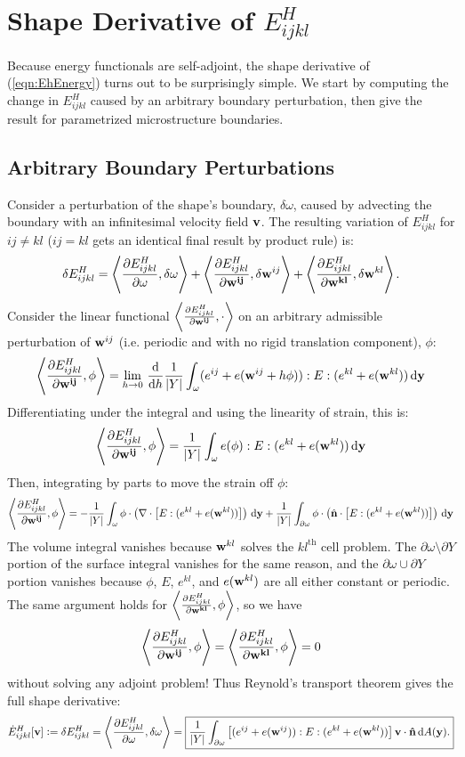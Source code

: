\documentclass[10pt]{article}
\providecommand{\dA}{\, \mathrm{d}A}
\providecommand{\pder}[2]{\frac{\partial #1}{\partial #2}}
\providecommand{\tder}[2]{\frac{\mathrm{d} #1}{\mathrm{d} #2}}
\newcommand{\defeq}{\vcentcolon=}
\begin{document}
\section{Shape Derivative of $E^H_{ijkl}$}
Because energy functionals are self-adjoint, the shape derivative of
(\ref{eqn:EhEnergy}) turns out to be surprisingly simple. We start by computing
the change in $E^H_{ijkl}$ caused by an arbitrary boundary perturbation, then
give the result for parametrized microstructure boundaries.

\subsection{Arbitrary Boundary Perturbations}
Consider a perturbation of the shape's boundary, $\delta\omega$, caused by
advecting the boundary with an infinitesimal velocity field ${\bf v}$. The
resulting variation of $E^H_{ijkl}$ for $ij \ne kl$ ($ij = kl$ gets an
identical final result by product rule) is:
$$
\delta E^H_{ijkl} = \left<\pder{E^H_{ijkl}}{\omega}, \delta \omega\right>
    + \left<\pder{E^H_{ijkl}}{{\bf w^{ij}}}, \delta {\bf w}^{ij}\right>
    + \left<\pder{E^H_{ijkl}}{{\bf w^{kl}}}, \delta {\bf w}^{kl}\right>.
$$
Consider the linear functional
$\left<\pder{E^H_{ijkl}}{{\bf w^{ij}}}, \cdot \right>$  on an arbitrary
admissible perturbation of ${\bf w}^{ij}$ (i.e. periodic and with no rigid
translation component), $\phi$:
$$
\left<\pder{E^H_{ijkl}}{{\bf w^{ij}}}, \phi\right> =
\lim_{h \to 0} \, \tder{}{h} \frac{1}{|Y|} \int_\omega (e^{ij} + e({\bf w}^{ij} + h \phi)) : E : (e^{kl} + e({\bf w}^{kl})) \, \mathrm{d} {\bf y}
$$
Differentiating under the integral and using the linearity of strain, this is:
$$
\left<\pder{E^H_{ijkl}}{{\bf w^{ij}}}, \phi\right> =
\frac{1}{|Y|} \int_\omega e(\phi) : E : (e^{kl} + e({\bf w}^{kl})) \, \mathrm{d} {\bf y}
$$
Then, integrating by parts to move the strain off $\phi$:
$$
\left<\pder{E^H_{ijkl}}{{\bf w^{ij}}}, \phi\right> =
-\frac{1}{|Y|} \int_\omega \phi \cdot \left(\nabla \cdot \left[E : (e^{kl} + e({\bf w}^{kl}))\right]\right) \, \mathrm{d} {\bf y}
+ \frac{1}{|Y|} \int_{\partial \omega} \phi \cdot \left(\hat{{\bf n}} \cdot \left[E : (e^{kl} + e({\bf w}^{kl}))\right]\right) \, \mathrm{d} {\bf y}
$$
The volume integral vanishes because ${\bf w}^{kl}$ solves the $kl^\text{th}$
cell problem. The $\partial \omega \setminus \partial Y$ portion of the surface
integral vanishes for the same reason, and the $\partial \omega \cup \partial
Y$ portion vanishes because $\phi$, $E$, $e^{kl}$, and $e({\bf w}^{kl})$ are all
either constant or periodic. The same argument holds for
$\left<\pder{E^H_{ijkl}}{{\bf w^{kl}}}, \phi\right>$, so we have
$$
\left<\pder{E^H_{ijkl}}{{\bf w^{ij}}}, \phi\right> =
\left<\pder{E^H_{ijkl}}{{\bf w^{kl}}}, \phi\right> = 0
$$
without solving any adjoint problem!
Thus Reynold's transport theorem gives the full shape derivative:
$$
\dot{E}^H_{ijkl}[{\bf v}] \defeq
\delta E^H_{ijkl} = \left<\pder{E^H_{ijkl}}{\omega}, \delta \omega\right> =
\boxed{
\frac{1}{|Y|} \int_{\partial \omega} \left[(e^{ij} + e({\bf w}^{ij})) : E : (e^{kl} + e({\bf w}^{kl}))\right] {\bf v} \cdot {\bf \hat{n}} \dA({\bf y}).}
$$
\end{document}
